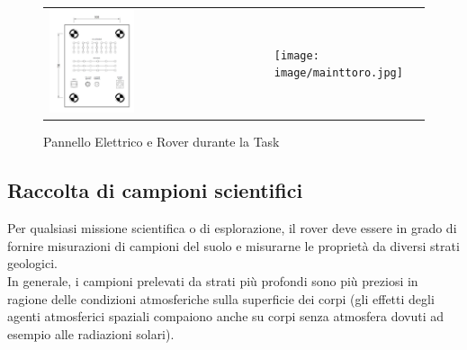 \documentclass[%
corpo=11pt,
twoside,
 stile=classica,
oldstyle,
greek,%
]{toptesi}
\begin{document}
		\begin{figure}
		\centering
		\begin{tabular}{ll}
		\includegraphics[width=0.4\textwidth]{image/panel.png}
		&
		\texttt{[image: image/mainttoro.jpg]}
		\end{tabular}
		\caption{Pannello Elettrico e Rover durante la Task}
		\label{fig:maintanance}
		\end{figure}
	
		\subsection{Raccolta di campioni scientifici}
		
		Per qualsiasi missione scientifica o di esplorazione, il rover deve essere in grado di fornire misurazioni di campioni  del suolo e misurarne le proprietà da diversi strati geologici. \\
		In generale, i campioni prelevati da strati più profondi sono più preziosi in ragione delle condizioni atmosferiche sulla superficie dei corpi (gli effetti degli agenti atmosferici spaziali compaiono anche su corpi senza atmosfera dovuti ad esempio alle radiazioni solari).\\
		
\end{document}
